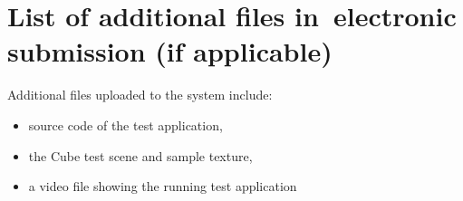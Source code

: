 \chapter{List of additional files in~electronic submission (if applicable)}

Additional files uploaded to the system include:
\begin{itemize}
\item source code of the test application,
\item the Cube test scene and sample texture,
\item a video file showing the running test application
\end{itemize}
